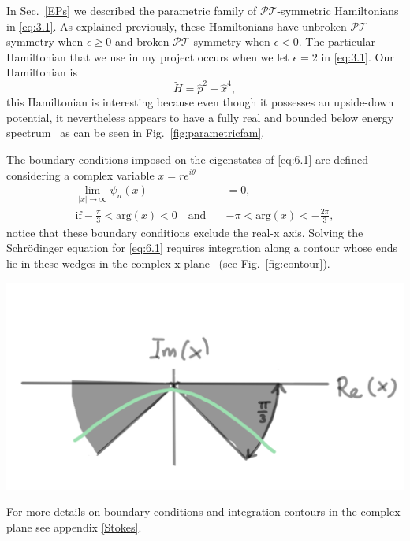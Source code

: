 \documentclass[12pt, a4paper]{report}
\newenvironment{Figure}
    {\par\medskip\noindent\minipage{\linewidth}}
    {\endminipage\par\medskip}
\newcommand\PT{\(\mathcal{PT}\)}
\begin{document}
In Sec.~\ref{EPs} we described the parametric family of \PT-symmetric Hamiltonians in \ref{eq:3.1}. As explained previously, these Hamiltonians have unbroken \PT\:symmetry when $\epsilon \geq 0$ and broken \PT-symmetry when $\epsilon < 0$. The particular Hamiltonian that we use in my project occurs when we let $\epsilon = 2$ in \ref{eq:3.1}. Our Hamiltonian is 
\begin{equation}\label{eq:6.1}
\tilde{H} = \hat{p}^2 - \hat{x}^{4},
\end{equation}
this Hamiltonian is interesting because even though it possesses an upside-down potential, it nevertheless appears to have a fully real and bounded below energy spectrum~\cite{UpsideDownPotentials} as can be seen in Fig.~\ref{fig:parametricfam}. 

The boundary conditions imposed on the eigenstates of \ref{eq:6.1} are defined considering a complex variable $x = r e^{i \theta}$
\begin{align}\label{eq:6.2}
\lim_{|x|\rightarrow \infty} \psi_n(x) &= 0, \nonumber\\
\mathrm{if}-\frac{\pi}{3} < \mathrm{arg}(x) < 0 \quad\mathrm{and}\quad&-\pi < \mathrm{arg}(x) < -\frac{2\pi}{3},
\end{align}
notice that these boundary conditions exclude the real-x axis. Solving the Schr\"{o}dinger equation for \ref{eq:6.1} requires integration along a contour whose ends lie in these wedges in the complex-x plane~\cite{UpsideDownPotentials} (see Fig.~\ref{fig:contour}).
\begin{Figure}
\centering
\includegraphics[width=.6\linewidth]{contour.pdf}
\label{fig:contour}
\end{Figure}
For more details on boundary conditions and integration contours in the complex plane see appendix \ref{Stokes}.
\end{document}
